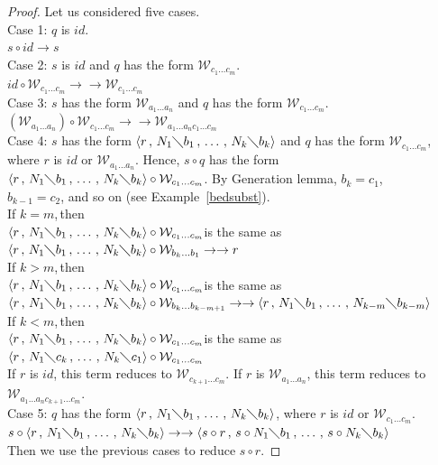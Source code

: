 \documentclass[11pt]{amsart}
\theoremstyle{plain}
\theoremstyle{definition}
\theoremstyle{remark}
\numberwithin{equation}{section}
\newcommand{\ci}{\circ}
\newcommand{\mi}{\,,\,}
\newcommand{\is}{\diagdown}
\newcommand{\arrow}{\rightarrow}
\newcommand{\la}{\langle}
\newcommand{\ra}{\rangle}
\newcommand{\twoh}{\arrow\arrow}
\newcommand{\x}{a}
\newcommand{\y}{b}
\newcommand{\z}{c}
\renewcommand{\pi}{\mathcal{W}}
\begin{document}
\begin{proof}Let us considered five cases.
\\[5pt]
Case 1: $q$ is $id$.\\
$s\ci id\arrow s$\\[5pt]
 Case 2: $s$ is $id$ and $q$ has the form
 $\pi_{\z_1\ldots\z_m}$.\\
  $id\ci
\pi_{\z_1\ldots\z_m}\twoh
 \pi_{\z_1\ldots\z_m}$\\[5pt]
Case 3: $s$ has the form $\pi_{\x_1\ldots\x_n}$ and $q$
has the form $\pi_{\z_1\ldots\z_m}$.\\
$(\pi_{\x_1\ldots\x_n})\ci\pi_{\z_1\ldots\z_m}\twoh
\pi_{\x_1\ldots\x_n\z_1\ldots\z_m}$\\[5pt]
Case 4: $s$ has the form $\la r\mi N_1\is \y_1\mi\ldots\mi N_k\is
\y_k\ra$ and $q$ has the form $\pi_{\z_1\ldots\z_m}$, where $r$ is
$id$ or
$\pi_{\x_1\ldots\x_n}$. Hence, $s\circ q$ has the form\\
$\la r\mi N_1\is \y_1\mi\ldots\mi N_k\is
\y_k\ra\ci\pi_{\z_1\ldots\z_m}$.
 By Generation lemma, $\y_k= \z_1$,\\ $\y_{k-1}= \z_2$, and so
on (see Example~\ref{bedsubst}). \\[5pt]
If $k=m$,\,then\\[5pt]
$\la r\mi N_1\is \y_1\mi\ldots\mi N_k\is
\y_k\ra\ci\pi_{\z_1\ldots\z_m}$\quad is the same as\\
$\la r\mi N_1\is \y_1\mi\ldots\mi N_k\is
\y_k\ra\ci\pi_{\y_k\ldots\y_1}\twoh r$\\[5pt]
If $k>m$,\,then \\[5pt]
$\la r\mi N_1\is \y_1\mi\ldots\mi N_k\is
\y_k\ra\ci\pi_{\z_1\ldots\z_m}$\quad is the same as\\
$\la r\mi N_1\is \y_1\mi\ldots\mi N_k\is
\y_k\ra\ci\pi_{\y_k\ldots\y_{k-m+1}}\twoh \la r\mi N_1\is
\y_1\mi\ldots\mi N_{k-m}\is \y_{k-m}\ra $\\[5pt]
If $k<m$,\,then\\[5pt]
$\la r\mi N_1\is \y_1\mi\ldots\mi N_k\is
\y_k\ra\ci\pi_{\z_1\ldots\z_m}$\quad is the same as\\
$\la r\mi N_1\is \z_k\mi\ldots\mi N_k\is
\z_1\ra\ci\pi_{\z_1\ldots\z_m}$\\
  If $r$ is $id$, this term reduces to
  $\pi_{\z_{k+1}\ldots\z_m}$. If $r$ is
  $\pi_{\x_1\ldots\x_n}$, this term reduces to
  $\pi_{\x_1\ldots\x_n\z_{k+1}\ldots\z_m}$.\\[5pt]
 Case 5: $q$ has the form $\la r\mi N_1\is
\y_1\mi\ldots\mi N_k\is \y_k\ra$,
 where $r$ is $id$ or $\pi_{\z_1\ldots\z_m}$.\\
$s\ci\la r\mi N_1\is \y_1\mi\ldots\mi N_k\is \y_k\ra\twoh\la s\ci
r\mi s\ci N_1\is \y_1\mi\ldots\mi s\ci N_k\is \y_k\ra$\\
  Then we
use the previous cases to reduce $s\ci r$.
\end{proof}
\end{document}

